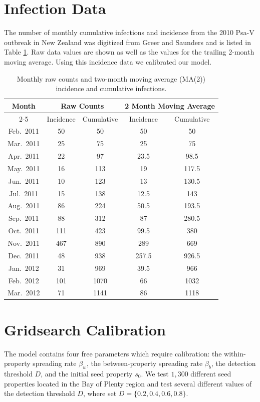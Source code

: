 \documentclass[a4paper,aps,superscriptaddress,floatfix,nofootinbib,longbibliography, onecolumn]{revtex4-1}
\begin{document}
\section{Infection Data}
The number of monthly cumulative infections and incidence from the 2010 Psa-V outbreak in New Zealand was digitized from Greer and Saunders \cite{greer2012costs} and is listed in Table \ref{tab:incidence_ma_simplified}. Raw data values are shown as well as the values for the trailing 2-month moving average. Using this incidence data we calibrated our model.
\begin{table}[H]
\centering
\caption{Monthly raw counts and two-month moving average (MA(2)) incidence and cumulative infections.}
\label{tab:incidence_ma_simplified}
\renewcommand{\arraystretch}{1.2}
\setlength{\tabcolsep}{6pt}
\begin{tabular}{|c|cc|cc|}
\hline
\textbf{Month} 
& \multicolumn{2}{c|}{\textbf{Raw Counts}} 
& \multicolumn{2}{c|}{\textbf{2 Month Moving Average}} \\
\cline{2-5}
 & Incidence & Cumulative 
 & Incidence & Cumulative \\
\hline
Feb.\ 2011 & 50  & 50   & 50  & 50   \\
Mar.\ 2011 & 25  & 75   & 25  & 75   \\
Apr.\ 2011 & 22  & 97   & 23.5  & 98.5  \\
May.\ 2011 & 16  & 113  & 19  & 117.5  \\
Jun.\ 2011 & 10  & 123  & 13  & 130.5  \\
Jul.\ 2011 & 15  & 138  & 12.5  & 143  \\
Aug.\ 2011 & 86  & 224  & 50.5  & 193.5  \\
Sep.\ 2011 & 88  & 312  & 87  & 280.5  \\
Oct.\ 2011 & 111 & 423  & 99.5 & 380  \\
Nov.\ 2011 & 467 & 890  & 289 & 669  \\
Dec.\ 2011 & 48  & 938  & 257.5 & 926.5  \\
Jan.\ 2012 & 31  & 969  & 39.5  & 966  \\
Feb.\ 2012 & 101 & 1070 & 66  & 1032 \\
Mar.\ 2012 & 71  & 1141 & 86  & 1118 \\
\hline
\end{tabular}
\end{table}
\section{Gridsearch Calibration}
    The model contains four free parameters which require calibration: the within-property spreading rate $\beta_w$, the between-property spreading rate $\beta_b$, the detection threshold $D$, and the initial seed property $s_0$. We test $1,300$ different seed properties located in the Bay of Plenty region and test several different values of the detection threshold $D$, where set $D = \{ 0.2,0.4,0.6,0.8\}$.
    
\end{document}
